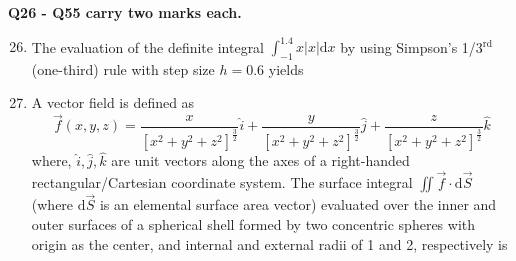 \documentclass[12pt,onecolumn]{article}
\begin{document}
\noindent\textbf{Q26 - Q55 carry two marks each.}
\begin{enumerate}
    \setcounter{enumi}{25}
    \item The evaluation of the definite integral $\int_{-1}^{1.4}x|x| \mathrm{d}x$ by using Simpson's 1/3$^\text{rd}$ (one-third) rule with step size $h=0.6$ yields
          \begin{enumerate}
          \end{enumerate}

    \item A vector field is defined as
          \[
              \vec{f}(x, y, z) = \frac{x}{\left[x^2+y^2+z^2\right]^{\frac{3}{2}}}\hat{i} + \frac{y}{\left[x^2+y^2+z^2\right]^{\frac{3}{2}}}\hat{j} + \frac{z}{\left[x^2+y^2+z^2\right]^{\frac{3}{2}}}\hat{k}
          \] where, $\hat{i}, \hat{j}, \hat{k}$ are unit vectors along the axes of a right-handed rectangular/Cartesian coordinate system. The surface integral $\iint \vec{f}\cdot\mathrm{d}\vec{S}$ (where $\mathrm{d}\vec{S}$ is an elemental surface area vector) evaluated over the inner and outer surfaces of a spherical shell formed by two concentric spheres with origin as the center, and internal and external radii of 1 and 2, respectively is
          \begin{enumerate}
          \end{enumerate}


\end{enumerate}
\end{document}
